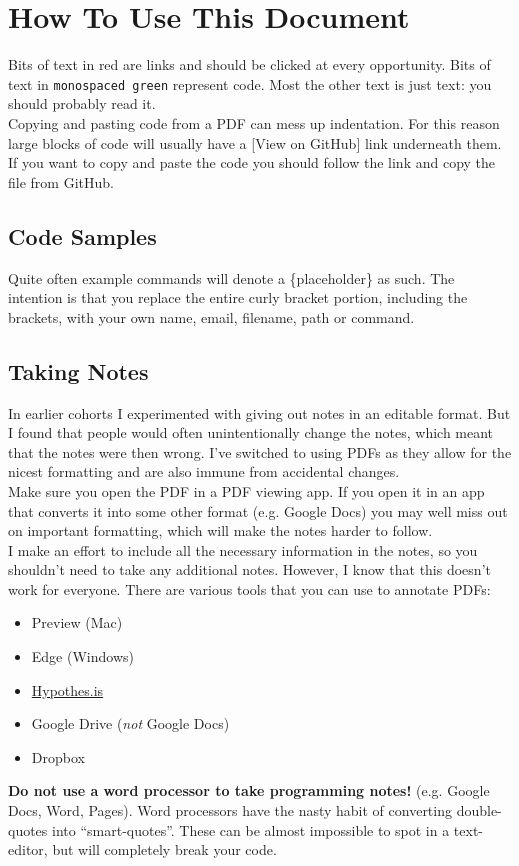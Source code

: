 \newpage

\section*{How To Use This Document}

Bits of text in \textcolor{dm-red}{red} are links and should be clicked at every opportunity. Bits of text in \texttt{monospaced green} represent code. Most the other text is just text: you should probably read it.
\\

Copying and pasting code from a PDF can mess up indentation. For this reason large blocks of code will usually have a [\textcolor{dm-red}{View on GitHub}] link underneath them. If you want to copy and paste the code you should follow the link and copy the file from GitHub.

\subsection*{Code Samples}

Quite often example commands will denote a \{placeholder\} as such. The intention is that you replace the entire curly bracket portion, including the brackets, with your own name, email, filename, path or command.

\subsection*{Taking Notes}

In earlier cohorts I experimented with giving out notes in an editable format. But I found that people would often unintentionally change the notes, which meant that the notes were then wrong. I've switched to using PDFs as they allow for the nicest formatting and are also immune from accidental changes.
\\

Make sure you open the PDF in a PDF viewing app. If you open it in an app that converts it into some other format (e.g. Google Docs) you may well miss out on important formatting, which will make the notes harder to follow.
\\

I make an effort to include all the necessary information in the notes, so you shouldn't need to take any additional notes. However, I know that this doesn't work for everyone. There are various tools that you can use to annotate PDFs:

\begin{itemize}
    \item Preview (Mac)
    \item Edge (Windows)
    \item \href{https://web.hypothes.is/quick-start-guide-for-students/}{Hypothes.is}
    \item Google Drive (\textit{not} Google Docs)
    \item Dropbox
\end{itemize}

\textbf{Do not use a word processor to take programming notes!} (e.g. Google Docs, Word, Pages). Word processors have the nasty habit of converting double-quotes into ``smart-quotes''. These can be almost impossible to spot in a text-editor, but will completely break your code.
